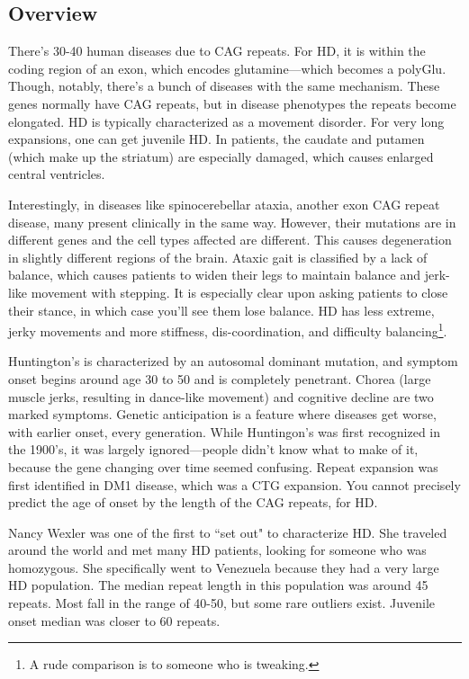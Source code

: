 \subsection*{Overview}
There's 30-40 human diseases due to CAG repeats. For HD, it is within the coding region of an exon, which encodes glutamine---which becomes a polyGlu. Though, notably, there's a bunch of diseases with the same mechanism. These genes normally have CAG repeats, but in disease phenotypes the repeats become elongated. HD is typically characterized as a movement disorder. For very long expansions, one can get juvenile HD. In patients, the caudate and putamen (which make up the striatum) are especially damaged, which causes enlarged central ventricles. \newline

Interestingly, in diseases like spinocerebellar ataxia, another exon CAG repeat disease, many present clinically in the same way. However, their mutations are in different genes and the cell types affected are different. This causes degeneration in slightly different regions of the brain. Ataxic gait is classified by a lack of balance, which causes patients to widen their legs to maintain balance and jerk-like movement with stepping. It is especially clear upon asking patients to close their stance, in which case you'll see them lose balance. HD has less extreme, jerky movements and more stiffness, dis-coordination, and difficulty balancing\footnote{A rude comparison is to someone who is tweaking.}. \newline

Huntington's is characterized by an autosomal dominant mutation, and symptom onset begins around age 30 to 50 and is completely penetrant. Chorea (large muscle jerks, resulting in dance-like movement) and cognitive decline are two marked symptoms. Genetic anticipation is a feature where diseases get worse, with earlier onset, every generation. While Huntingon's was first recognized in the 1900's, it was largely ignored---people didn't know what to make of it, because the gene changing over time seemed confusing. Repeat expansion was first identified in DM1 disease, which was a CTG expansion. You cannot precisely predict the age of onset by the length of the CAG repeats, for HD. \newline

Nancy Wexler was one of the first to ``set out" to characterize HD. She traveled around the world and met many HD patients, looking for someone who was homozygous. She specifically went to Venezuela because they had a very large HD population. The median repeat length in this population was around 45 repeats. Most fall in the range of 40-50, but some rare outliers exist. Juvenile onset median was closer to 60 repeats.\newline

